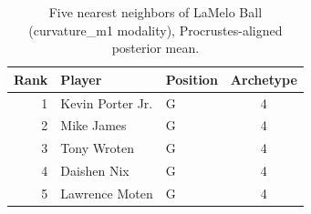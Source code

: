 \begin{table}[htbp]
  \centering\small
  \begin{tabular}{rllc}
    \toprule
    Rank & Player & Position & Archetype \\
    \midrule
    1 & Kevin Porter Jr. & G & 4 \\
    2 & Mike James & G & 4 \\
    3 & Tony Wroten & G & 4 \\
    4 & Daishen Nix & G & 4 \\
    5 & Lawrence Moten & G & 4 \\
    \bottomrule
  \end{tabular}
  \caption{Five nearest neighbors of LaMelo Ball (curvature_m1 modality), Procrustes-aligned posterior mean.}
  \label{tab:LaMelo_Ball_neighbors_curvature_m1}
\end{table}

